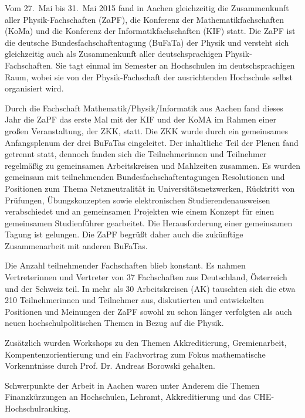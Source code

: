 
Vom  27.\ Mai bis 31.\ Mai 2015 fand in Aachen gleichzeitig die Zusammenkunft
aller Physik-Fachschaften (ZaPF), die Konferenz der Mathematikfachschaften
(KoMa) und die Konferenz der Informatikfachschaften (KIF) statt. Die ZaPF ist
die deutsche  Bundesfachschaftentagung (BuFaTa) der Physik und versteht sich
gleichzeitig auch  als Zusammenkunft aller deutschsprachigen
Physik-Fachschaften. Sie tagt einmal im Semester an Hochschulen im
deutschsprachigen Raum, wobei sie  von der  Physik-Fachschaft der ausrichtenden
Hochschule selbst organisiert wird.

Durch die Fachschaft Mathematik/Physik/Informatik aus Aachen fand dieses Jahr
die ZaPF das erste Mal mit der KIF und der KoMA im Rahmen einer großen
Veranstaltung, der ZKK, statt. Die ZKK wurde durch ein gemeinsames
Anfangsplenum der drei BuFaTas eingeleitet. Der inhaltliche Teil der Plenen
fand getrennt statt, dennoch fanden sich die Teilnehmerinnen und Teilnehmer
regelmäßig zu gemeinsamen Arbeitskreisen und Mahlzeiten
zusammen. 
Es wurden gemeinsam mit teilnehmenden Bundesfachschaftentagungen Resolutionen und Positionen zum Thema Netzneutralität in Universitätsnetzwerken, Rücktritt von Prüfungen, Übungskonzepten sowie elektronischen Studierendenausweisen verabschiedet und an gemeinsamen Projekten wie einem Konzept für einen gemeinsamen Studienführer gearbeitet. Die Herausforderung einer  gemeinsamen Tagung ist gelungen. 
Die ZaPF begrüßt daher auch die zukünftige Zusammenarbeit mit anderen BuFaTas.

Die Anzahl teilnehmender Fachschaften blieb konstant. Es nahmen
Vertreterinnen und Vertreter von 37 Fachschaften aus Deutschland, Österreich
und der Schweiz teil. In mehr als 30 Arbeitskreisen (AK) tauschten sich die
etwa 210 Teilnehmerinnen und Teilnehmer aus, diskutierten und entwickelten
Positionen und Meinungen der ZaPF sowohl zu schon länger verfolgten  als auch
neuen hochschulpolitischen Themen in Bezug auf die Physik. 
\newpage

Zusätzlich wurden
Workshops zu den Themen Akkreditierung, Gremienarbeit, Kompentenzorientierung
und ein Fachvortrag zum Fokus mathematische Vorkenntnisse durch Prof. Dr.
Andreas Borowski gehalten.

Schwerpunkte der Arbeit in Aachen waren unter Anderem die Themen Finanzkürzungen
an Hochschulen, Lehramt, Akkreditierung und das CHE-Hochschulranking.


\renewcommand{\headrulewidth}{0.1pt}
\rhead{\thepage}


